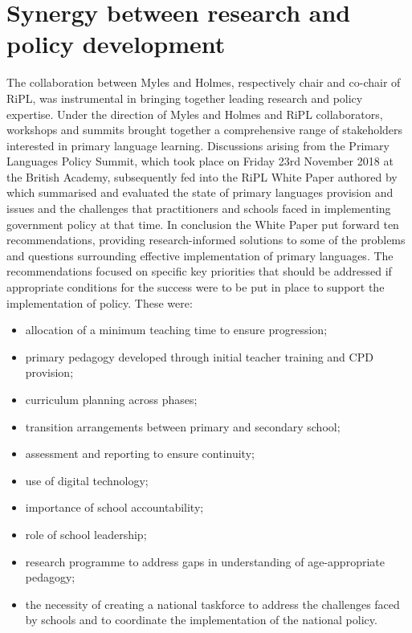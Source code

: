 \documentclass[output=paper]{langscibook}
\begin{document}
\section{Synergy between research and policy development}

The collaboration between Myles and Holmes, respectively chair and co-chair of RiPL, was instrumental in bringing together leading research and policy expertise. Under the direction of Myles and Holmes and RiPL collaborators, workshops and summits brought together a comprehensive range of stakeholders interested in primary language learning. Discussions arising from the Primary Languages Policy Summit, which took place on Friday 23rd November 2018 at the British Academy, subsequently fed into the RiPL White Paper authored by \citet{HolmesMyles2019} which summarised and evaluated the state of primary languages provision and issues and the challenges that practitioners and schools faced in implementing government policy at that time. In conclusion the White Paper put forward ten recommendations, providing research-informed solutions to some of the problems and questions surrounding effective implementation of primary languages. The recommendations focused on specific key priorities that should be addressed if appropriate conditions for the success were to be put in place to support the implementation of policy. These were: 

\begin{itemize}
\item allocation of a minimum teaching time to ensure progression; 
\item primary pedagogy developed through initial teacher training and CPD provision; 
\item curriculum planning across phases; 
\item transition arrangements between primary and secondary school; 
\item assessment and reporting to ensure continuity; 
\item use of digital technology; 
\item importance of school accountability; 
\item role of school leadership; 
\item research programme to address gaps in understanding of age-appropriate pedagogy;
\item the necessity of creating a national taskforce to address the challenges faced by schools and to coordinate the implementation of the national policy. 
\end{itemize}
\end{document}
